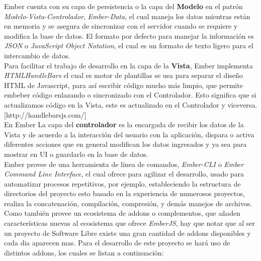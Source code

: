 Ember cuenta con su capa de persistencia o la capa del \textbf{Modelo} en el patrón \emph{Modelo-Vista-Controlador}, \emph{Ember-Data}, el cual maneja los datos mientras están en memoria y se asegura de sincronizar con el servidor cuando se requiere y modifica la base de datos. El formato por defecto para manejar la información es \emph{JSON} o \emph{JavaScript Object Notation}, el cual es un formato de texto ligero para el intercambio de datos.\\


Para facilitar el trabajo de desarrollo en la capa de la \textbf{Vista}, Ember implementa \emph{HTMLHandleBars} el cual es motor de plantillas se usa para separar el diseño HTML de Javascript, para así escribir código mucho más limpio, que permite embeber código enlazando o sincronizado con el Controlador. Esto significa que si actualizamos código en la Vista, este es actualizado en el Controlador y viceversa. [http://handlebarsjs.com/] \\



En Ember La capa del \textbf{controlador} es  la encargada de recibir los datos de la Vista y de acuerdo a la interacción del usuario con la aplicación, dispara o activa diferentes acciones que en general modifican los datos ingresados y ya sea para mostrar en UI o guardarlo en la base de datos.\\


Ember provee de una herramienta de línea de comandos, \emph{Ember-CLI} o \emph{Ember Command Line Interface}, el cual ofrece para agilizar el desarrollo, usado para automatizar procesos repetitivos, por ejemplo, estableciendo la estructura de directorios del proyecto esto basado en la experiencia de numerosos proyectos, realiza la concatenación, compilación, compresión, y demás manejos de archivos. Como también provee un ecosistema de addons o complementos, que añaden  características nuevas al ecosistema que ofrece \emph{EmberJS}, hay que notar que al ser un proyecto de Software Libre existe una gran cantidad de addons disponibles y cada dia aparecen mas.
Para el desarrollo de este proyecto se hará uso de distintos addons, los cuales se listan a continuación:

